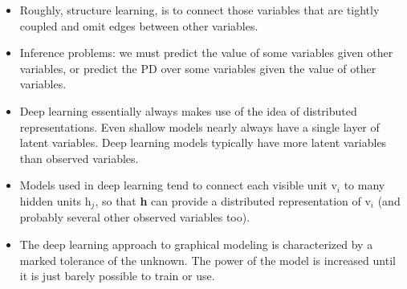 \documentclass{article}
\begin{document}
\begin{itemize}
\item Roughly, structure learning, is to connect those variables that are tightly coupled and omit edges between other variables.
\item Inference problems: we must predict the value of some variables given other variables, or predict the PD over some variables given the value of other variables.
\item Deep learning essentially always makes use of the idea of distributed representations. Even shallow models nearly always have a single layer of latent variables. Deep learning models typically have more latent variables than observed variables.
\item Models used in deep learning tend to connect each visible unit v\(_i\) to many hidden units h\(_j\), so that \textbf{h} can provide a distributed representation of v\(_i\) (and probably several other observed variables too).
\item The deep learning approach to graphical modeling is characterized by a marked tolerance of the unknown. The power of the model is increased until it is just barely possible to train or use.
\end{itemize}
\end{document}
